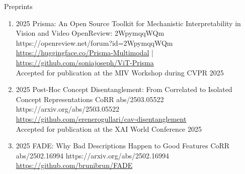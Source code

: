 \headedsubsection %
{Preprints}{}
{
    \begin{enumerate}


        \item {}
                        {2025}
                        {Prisma: An Open Source Toolkit for Mechanistic Interpretability in Vision and Video}
                        {OpenReview: 2WpymqqWQm}
                        {https://openreview.net/forum?id=2WpymqqWQm}
                        {
                            \\\href{https://huggingface.co/Prisma-Multimodal}{https://huggingface.co/Prisma-Multimodal} | \href{https://github.com/soniajoseph/ViT-Prisma}{https://github.com/soniajoseph/ViT-Prisma}
                            \\ Accepted for publication at the MIV Workshop during CVPR 2025
                        }



        \item {}
                        {2025}
                        {Post-Hoc Concept Disentanglement: From Correlated to Isolated Concept Representations}
                        {CoRR abs/2503.05522}
                        {https://arxiv.org/abs/2503.05522}
                        {
                            \\\href{https://github.com/erenerogullari/cav-disentanglement}{https://github.com/erenerogullari/cav-disentanglement}
                            \\ Accepted for publication at the XAI World Conference 2025
                        }
        
        \item {}
                        {2025}
                        {FADE: Why Bad Descriptions Happen to Good Features}
                        {CoRR abs/2502.16994}
                        {https://arxiv.org/abs/2502.16994}
                        {
                            \\\href{https://github.com/brunibrun/FADE}{https://github.com/brunibrun/FADE}
                        }
                        

\end{enumerate}}
